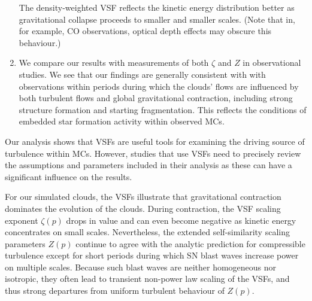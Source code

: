 \begin{enumerate}
	The density-weighted VSF reflects the kinetic energy distribution better as gravitational collapse proceeds to smaller and smaller scales. 
	(Note that in, for example, CO observations, optical depth effects may obscure this behaviour.) 
	\item We compare our results with measurements of both $\zeta$ and $Z$ in observational studies. 
	We see that our findings are generally consistent with with observations within periods during which the clouds' flows are influenced by both turbulent flows and global gravitational contraction, including strong structure formation and starting fragmentation. 
	This reflects the conditions of embedded star formation activity within observed MCs.
\end{enumerate}

Our analysis shows that VSFs are useful tools for examining the driving source of turbulence within MCs.
However, studies that use VSFs need to precisely review the assumptions and parameters included in their analysis as these can have a significant influence on the results.

For our simulated clouds, the VSFs illustrate that gravitational contraction dominates the evolution of the clouds.
During contraction, the VSF scaling exponent $\zeta(p)$ drops in value and can even become negative as kinetic energy concentrates on small scales.
Nevertheless, the extended self-similarity scaling parameters $Z(p)$ continue to agree with the analytic prediction for compressible turbulence except for short periods during which SN blast waves increase power on multiple scales.
Because such blast waves are neither homogeneous nor isotropic, they often lead to transient non-power law scaling of the VSFs, and thus strong departures from uniform turbulent behaviour of $Z(p)$.


\endinput
